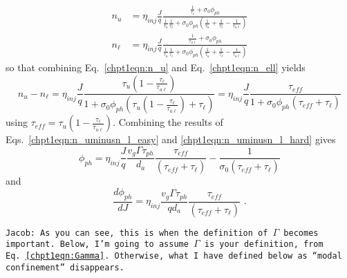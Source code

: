 \documentclass[12pt]{report}
\begin{document}
\begin{subequations}
\begin{align}
\label{chpt1eqn:n_u}
n_u &= \eta_\textit{inj}\frac{J}{q} \frac{\frac{1}{\tau_\ell}+\sigma_0 \phi_{ph}}{\frac{1}{\tau_u} \frac{1}{\tau_\ell}+\sigma_0 \phi_{ph} \left(\frac{1}{\tau_u} + \frac{1}{\tau_\ell} - \frac{1}{\tau_{u\ell}} \right)} \\
\label{chpt1eqn:n_ell}
n_\ell &= \eta_\textit{inj}\frac{J}{q} \frac{\frac{1}{\tau_{u\ell}}+\sigma_0 \phi_{ph}}{\frac{1}{\tau_u} \frac{1}{\tau_\ell}+\sigma_0 \phi_{ph} \left(\frac{1}{\tau_u} + \frac{1}{\tau_\ell} - \frac{1}{\tau_{u\ell}} \right)}
\end{align}
\end{subequations}
so that combining Eq.~\eqref{chpt1eqn:n_u} and Eq.~\eqref{chpt1eqn:n_ell} yields
\begin{equation}
\label{chpt1eqn:n_uminusn_l_hard}
n_u-n_\ell = \eta_\textit{inj}\frac{J}{q}  \frac{\tau_u \left(1-\frac{\tau_\ell}{\tau_{u\ell}}\right)}{1+\sigma_0 \phi_{ph} \left(\tau_u \left(1-\frac{\tau_\ell}{\tau_{u\ell}}\right) + \tau_\ell\right)} = \eta_\textit{inj}\frac{J}{q}  \frac{\tau_\textit{eff}}{1+\sigma_0 \phi_{ph} \left(\tau_\textit{eff} + \tau_\ell\right)}
\end{equation}
using $\tau_\textit{eff}=\tau_u\left(1-\frac{\tau_\ell}{\tau_{u\ell}}\right)$.
Combining the results of Eqs.~\eqref{chpt1eqn:n_uminusn_l_easy} and \eqref{chpt1eqn:n_uminusn_l_hard} gives
\begin{equation}
\phi_{ph} = \eta_\textit{inj} \frac{J}{q} \frac{v_g \Gamma \tau_{ph}}{d_a} \frac{\tau_\textit{eff}}{\left(\tau_\textit{eff}+\tau_\ell\right)} - \frac{1}{\sigma_0 \left(\tau_\textit{eff}+\tau_\ell\right)}
\end{equation}
and
\begin{equation}
\frac{d \phi_{ph}}{d\!J} = \eta_\textit{inj} \frac{v_g \Gamma \tau_{ph}}{q d_a} \frac{\tau_\textit{eff}}{\left(\tau_\textit{eff}+\tau_\ell\right)} \text{~.}
\end{equation}

\bigskip
\noindent
\texttt{Jacob: As you can see, this is when the definition of $\Gamma$ becomes important.  Below, I'm going to assume $\Gamma$ is your definition, from Eq.~\eqref{chpt1eqn:Gamma}.  Otherwise, what I have defined below as ``modal confinement'' disappears.}
\end{document}
